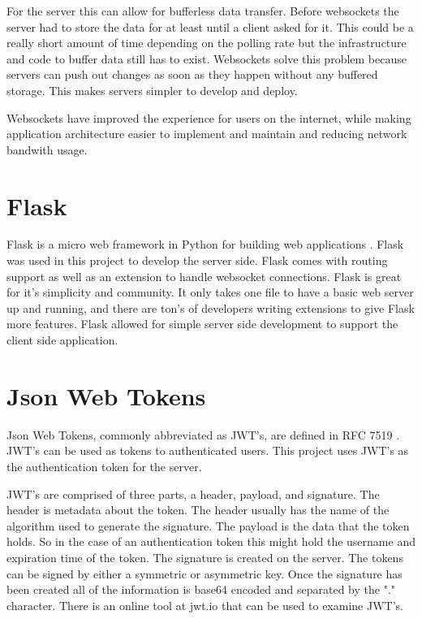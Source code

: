 For the server this can allow for bufferless data transfer. Before websockets the server had to store the data for at least until a client asked for it. This could be a really short amount of time depending on the polling rate but the infrastructure and code to buffer data still has to exist. Websockets solve this problem because servers can push out changes as soon as they happen without any buffered storage. This makes servers simpler to develop and deploy.


Websockets have improved the experience for users on the internet, while making application architecture easier to implement and maintain and reducing network bandwith usage.


\section{Flask}


Flask is a micro web framework in Python for building web applications \cite{flask}.
Flask was used in this project to develop the server side. Flask comes with routing support as well as an extension to handle websocket connections. Flask is great for it's simplicity and community. It only takes one file to have a basic web server up and running, and there are ton's of developers writing extensions to give Flask more features. Flask allowed for simple server side development to support the client side application.


\section{Json Web Tokens}


Json Web Tokens, commonly abbreviated as JWT's, are defined in RFC 7519 \cite{jwt-rfc}. JWT's can be used as tokens to authenticated users. This project uses JWT's as the authentication token for the server.


JWT's are comprised of three parts, a header, payload, and signature. The header is metadata about the token. The header usually has the name of the algorithm used to generate the signature. The payload is the data that the token holds. So in the case of an authentication token this might hold the username and expiration time of the token. The signature is created on the server. The tokens can be signed by either a symmetric or asymmetric key. Once the signature has been created all of the information is base64 encoded and separated by the "." character. There is an online tool at jwt.io that can be used to examine JWT's. 


